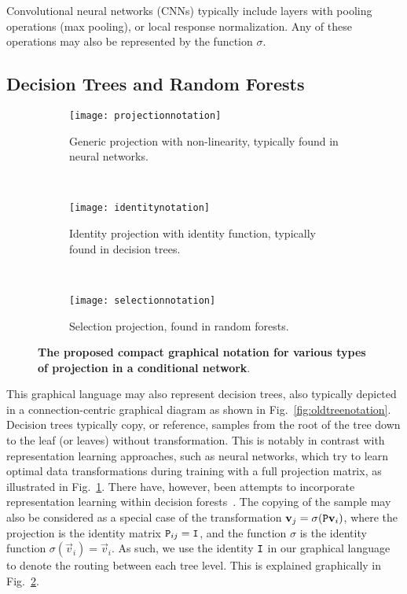 \documentclass[thesis]{subfiles}
\begin{document}
	Convolutional neural networks (CNNs) typically include layers with pooling operations (\eg max pooling), or local response normalization. Any of these operations may also be represented by the function $\sigma$.
	
	\subsection{Decision Trees and Random Forests}
	
	\begin{figure}[tbp] 
		\centering
		\begin{subfigure}[b]{\textwidth}
			\centering
			\texttt{[image: projectionnotation]}
			\caption{Generic projection with non-linearity, typically found in neural networks.}
			\label{fig:projectionnotation}
		\end{subfigure}
		~
		\begin{subfigure}[b]{\textwidth}
			\centering
			\texttt{[image: identitynotation]}
			\caption{Identity projection with identity function, typically found in decision trees.}
			\label{fig:identitynotation}
		\end{subfigure}
		~
		\begin{subfigure}[b]{\textwidth}
			\centering
			\texttt{[image: selectionnotation]}
			\caption{Selection projection, found in random forests.}
			\label{fig:selectionnotation}
		\end{subfigure}
		\caption[Various projection matrices in conditional networks.]{{\bf The proposed compact graphical notation for various types of projection in a conditional network}.}
		\label{fig:projections}
	\end{figure}
	
	This graphical language may also represent decision trees, also typically depicted in a connection-centric graphical diagram as shown in Fig.~\ref{fig:oldtreenotation}. Decision trees typically copy, or reference, samples from the root of the tree down to the leaf (or leaves) without transformation. This is notably in contrast with representation learning approaches, such as neural networks, which try to learn optimal data transformations during training with a full projection matrix, as illustrated in Fig.~\ref{fig:projectionnotation}. There have, however, been attempts to incorporate representation learning within decision forests~\citep{montillo2011entangled,BuloKontsch2014}. The copying of the sample may also be considered as a special case of the transformation $\vec v_j = \sigma(\mat P \vec v_i)$, where the projection is the identity matrix $\mat P_{ij} = \mat I$, and the function $\sigma$ is the identity function $\sigma(\vec v_i) = \vec v_i$. As such, we use the identity $\mat I$ in our graphical language to denote the routing between each tree level. This is explained graphically in Fig.~\ref{fig:identitynotation}.
	
\end{document}
